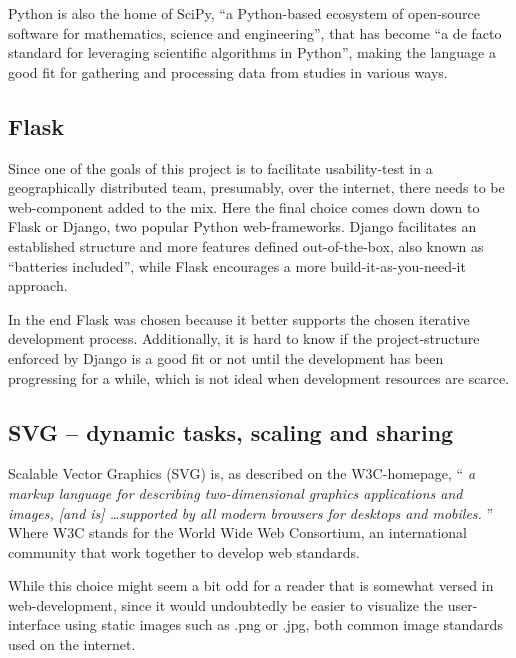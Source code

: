 {  Python is also the home of SciPy, ``a Python-based ecosystem of open-source
  software for mathematics, science and engineering''\cite{citeSciPyHomepage},
  that has become ``a de facto
  standard for leveraging scientific algorithms in
  Python''\cite{citeSciPyPaper}, making the language a good fit for gathering
  and processing data from studies in various ways.

  \subsection{Flask}

  Since one of the goals of this project is to facilitate usability-test in a
  geographically distributed team, presumably, over the internet, there
  needs to be web-component added to the mix. Here the final choice comes down
  down to Flask\cite{citeFlaskHomepage} or Django\cite{citeDjangoHomepage},
  two popular Python web-frameworks. Django facilitates an established
  structure and more features defined out-of-the-box, also known as ``batteries
  included'', while Flask encourages a more build-it-as-you-need-it approach.

  In the end Flask was chosen because it better supports the chosen iterative
  development process. Additionally, it is hard to know if the
  project-structure enforced by Django is a good fit or not until the
  development has been progressing for a while, which is not ideal when
  development resources are scarce.


%
%

  \subsection{SVG -- dynamic tasks, scaling and sharing}

  Scalable Vector Graphics (SVG) is, as described on the W3C-homepage, ``%
  \textit{%
    a markup language for describing two-dimensional graphics applications and
    images, [and is] \ldots supported by all modern browsers for desktops and
    mobiles.%
  }''\cite{citeW3CSVG}
  Where W3C stands for the World Wide Web Consortium, an international
  community that work together to develop web standards\cite{citeW3CHomepage}.

  While this choice might seem a bit odd for a reader that is somewhat versed
  in web-development, since it would undoubtedly be easier to visualize the
  user-interface using static images such as .png or .jpg, both common image
  standards used on the internet.

}
